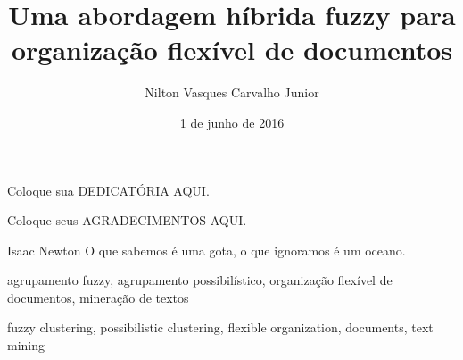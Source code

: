 \documentclass[bsc, classic, a4paper, oneside]{ufbathesis}
\institute{INSTITUTO DE MATEMÁTICA}
\title{Uma abordagem híbrida fuzzy para organização flexível de documentos}
\date{1 de junho de 2016}
\author{Nilton Vasques Carvalho Junior}
\begin{document}
\pgcompfrontpage{}

\frontmatter

\pgcomppresentationpage

\catalogingsheet


\begin{dedicatory}
Coloque sua DEDICATÓRIA AQUI.
\end{dedicatory}

\acknowledgements
Coloque seus AGRADECIMENTOS AQUI.

\begin{epigraph}[1687]{Isaac Newton}
  O que sabemos é uma gota, o que ignoramos é um oceano.
\end{epigraph}

\resumo

\begin{keywords}
agrupamento fuzzy, agrupamento possibilístico, organização flexível de documentos, 
mineração de textos
\end{keywords}

\abstract

\begin{keywords}
fuzzy clustering, possibilistic clustering, flexible organization, documents, text mining
\end{keywords}
\end{document}
